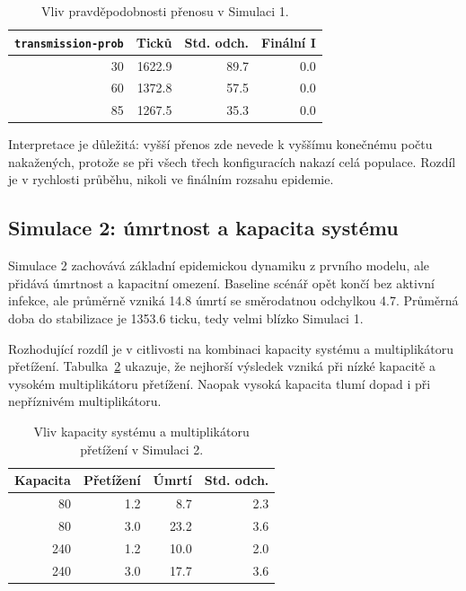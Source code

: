 \documentclass{article}
\begin{document}
\begin{table}[htbp]
\centering
\small
\begin{tabular}{r r r r}
\hline
\textbf{\texttt{transmission-prob}} & \textbf{Ticků} & \textbf{Std. odch.} & \textbf{Finální I} \\
\hline
30 & 1622.9 & 89.7 & 0.0 \\
60 & 1372.8 & 57.5 & 0.0 \\
85 & 1267.5 & 35.3 & 0.0 \\
\hline
\end{tabular}
\caption{Vliv pravděpodobnosti přenosu v Simulaci 1.}
\label{tab:s1_transmission}
\end{table}

Interpretace je důležitá: vyšší přenos zde nevede k vyššímu konečnému počtu
nakažených, protože se při všech třech konfiguracích nakazí celá populace.
Rozdíl je v rychlosti průběhu, nikoli ve finálním rozsahu epidemie.

\subsection{Simulace 2: úmrtnost a kapacita systému}

Simulace 2 zachovává základní epidemickou dynamiku z prvního modelu, ale přidává
úmrtnost a kapacitní omezení. Baseline scénář opět končí bez aktivní infekce,
ale průměrně vzniká 14.8 úmrtí se směrodatnou odchylkou 4.7. Průměrná doba do
stabilizace je 1353.6 ticku, tedy velmi blízko Simulaci 1.

Rozhodující rozdíl je v citlivosti na kombinaci kapacity systému a multiplikátoru
přetížení. Tabulka~\ref{tab:s2_capacity} ukazuje, že nejhorší výsledek vzniká
při nízké kapacitě a vysokém multiplikátoru přetížení. Naopak vysoká kapacita
tlumí dopad i při nepříznivém multiplikátoru.

\begin{table}[htbp]
\centering
\small
\begin{tabular}{r r r r}
\hline
\textbf{Kapacita} & \textbf{Přetížení} & \textbf{Úmrtí} & \textbf{Std. odch.} \\
\hline
80 & 1.2 & 8.7 & 2.3 \\
80 & 3.0 & 23.2 & 3.6 \\
240 & 1.2 & 10.0 & 2.0 \\
240 & 3.0 & 17.7 & 3.6 \\
\hline
\end{tabular}
\caption{Vliv kapacity systému a multiplikátoru přetížení v Simulaci 2.}
\label{tab:s2_capacity}
\end{table}
\end{document}
